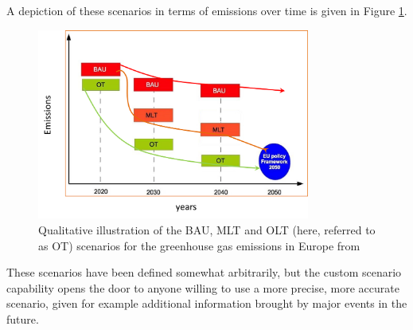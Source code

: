 A depiction of these scenarios in terms of emissions over time is given in Figure \ref{fig:medeas-scenarios}.

\begin{figure}[h]
    \centering
    \includegraphics[width=0.8\textwidth]{resources/images/medeas-scenarios.png}
    \caption{Qualitative illustration of the BAU, MLT and OLT (here, referred to as OT) scenarios for the greenhouse gas emissions in Europe from \cite{medeas-website}}
    \label{fig:medeas-scenarios}
\end{figure}

These scenarios have been defined somewhat arbitrarily, but the custom scenario capability opens the door to anyone willing to use a more precise, more accurate scenario, given for example additional information brought by major events in the future.